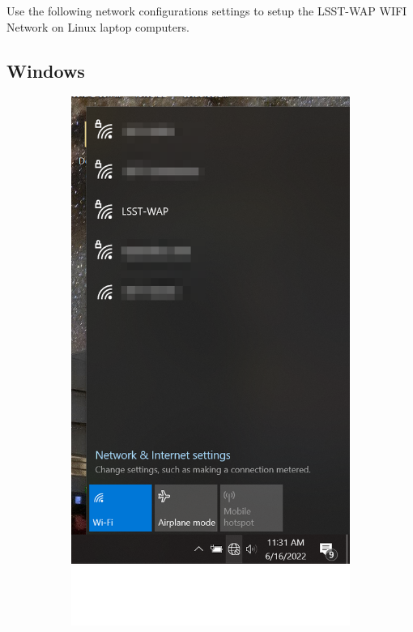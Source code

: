   Use the following network configurations settings to setup the LSST-WAP WIFI Network on Linux laptop computers. 

  \newpage
  \vspace{20mm}
  \subsection{Windows}
  \begin{figure}
    \centering
    \begin{subfigure}{0.35\textwidth}
      \includegraphics[width=\textwidth]{Images/Windows1.png}

\end{subfigure}
\end{figure}
